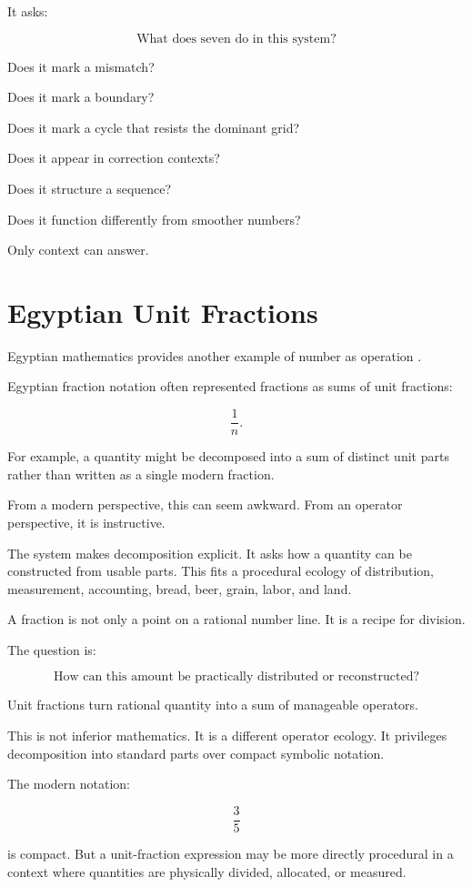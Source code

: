 \documentclass[11pt]{book}
\begin{document}
It asks:

\[
\text{What does seven do in this system?}
\]

Does it mark a mismatch?

Does it mark a boundary?

Does it mark a cycle that resists the dominant grid?

Does it appear in correction contexts?

Does it structure a sequence?

Does it function differently from smoother numbers?

Only context can answer.

\section{Egyptian Unit Fractions}

Egyptian mathematics provides another example of number as operation \cite{Clagett1989AncientEgyptianScience1}.

Egyptian fraction notation often represented fractions as sums of unit fractions:

\[
\frac{1}{n}.
\]

For example, a quantity might be decomposed into a sum of distinct unit parts rather than written as a single modern fraction.

From a modern perspective, this can seem awkward. From an operator perspective, it is instructive.

The system makes decomposition explicit. It asks how a quantity can be constructed from usable parts. This fits a procedural ecology of distribution, measurement, accounting, bread, beer, grain, labor, and land.

A fraction is not only a point on a rational number line. It is a recipe for division.

The question is:

\[
\text{How can this amount be practically distributed or reconstructed?}
\]

Unit fractions turn rational quantity into a sum of manageable operators.

This is not inferior mathematics. It is a different operator ecology. It privileges decomposition into standard parts over compact symbolic notation.

The modern notation:

\[
\frac{3}{5}
\]

is compact. But a unit-fraction expression may be more directly procedural in a context where quantities are physically divided, allocated, or measured.
\end{document}
